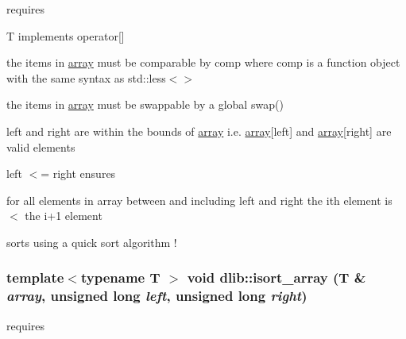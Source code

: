 \label{namespacedlib_ad2483eaef67b51922017370294317395}
requires
\begin{DoxyItemize}
\item T implements operator\mbox{[}\mbox{]}
\item the items in \hyperlink{classdlib_1_1array}{array} must be comparable by comp where comp is a function object with the same syntax as std::less$<$$>$
\item the items in \hyperlink{classdlib_1_1array}{array} must be swappable by a global swap()
\item left and right are within the bounds of \hyperlink{classdlib_1_1array}{array} i.e. \hyperlink{classdlib_1_1array}{array}\mbox{[}left\mbox{]} and \hyperlink{classdlib_1_1array}{array}\mbox{[}right\mbox{]} are valid elements
\item left $<$= right ensures
\item for all elements in array between and including left and right the ith element is $<$ the i+1 element
\item sorts using a quick sort algorithm ! 
\end{DoxyItemize}\hypertarget{namespacedlib_af630f6e36af2fed569135ae72246e016}{
\subsubsection[{isort\_\-array}]{\setlength{\rightskip}{0pt plus 5cm}template$<$typename T $>$ void dlib::isort\_\-array (T \& {\em array}, \/  unsigned long {\em left}, \/  unsigned long {\em right})}}
\label{namespacedlib_af630f6e36af2fed569135ae72246e016}
requires
